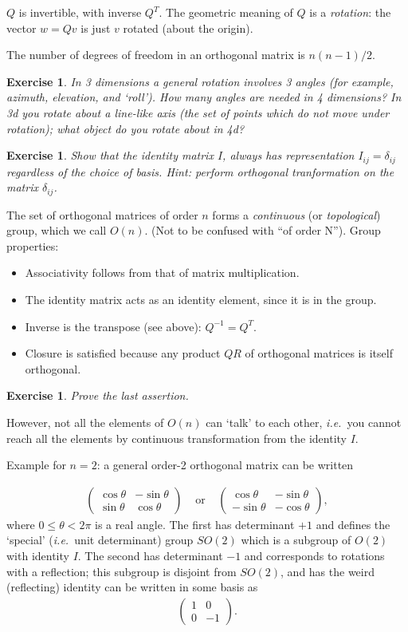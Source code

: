 \documentclass[12pt,letterpaper]{report}
\newcommand\bea{\begin{eqnarray}}
\newcommand\eea{\end{eqnarray}}
\newcommand\bi{\begin{itemize}}
\newcommand\ei{\end{itemize}}
\newcommand\ie{{\it i.e.\ }}
\newtheorem{exe}[thm]{Exercise}
\begin{document}
$Q$ is invertible, with inverse $Q^T$. The geometric meaning of
$Q$ is a {\em rotation}: the vector $w = Q v$ is just $v$ rotated
(about the origin).


The number of degrees of freedom in an orthogonal matrix is
$n(n-1)/2$.

\begin{exe}
In 3 dimensions a general rotation involves 3 angles (for example,
azimuth, elevation, and `roll'). How many angles are needed in 4
dimensions? In 3d you rotate about a line-like axis (the set of
points which do not move under rotation); what object do you
rotate about in 4d?
\end{exe}

\begin{exe}
Show that the identity matrix $I$, always has representation
$I_{ij} = \delta_{ij}$ regardless of the choice of basis. Hint:
perform orthogonal tranformation on the matrix $\delta_{ij}$.
\end{exe}


The set of orthogonal matrices of order $n$ forms a {\em
continuous} (or {\em topological}) group, which we call $O(n)$.
(Not to be confused with ``of order N''). Group properties: \bi
\item Associativity follows from that of matrix multiplication.
\item The identity matrix acts as an identity element, since it
is in the group.
\item Inverse is the transpose (see above): $Q^{-1} = Q^T$.
\item Closure is satisfied because any product $QR$ of orthogonal
matrices is itself orthogonal. \ei

\begin{exe}
Prove the last assertion.
\end{exe}

However, not all the elements of $O(n)$ can `talk' to each other,
\ie you cannot reach all the elements by continuous transformation
from the identity $I$.

Example for $n=2$: a general order-2 orthogonal matrix can be
written

\bea
\left(\begin{array}{ll}\cos \theta & -\sin\theta\\
\sin \theta & \cos\theta\end{array}\right)
\;\;\;\;\mbox{or}\;\;\;\;
\left(\begin{array}{ll}\cos \theta & -\sin\theta\\
-\sin \theta & -\cos\theta\end{array}\right) , \eea where $0 \le
\theta < 2\pi$ is a real angle. The first has determinant $+1$ and
defines the `special' (\ie unit determinant) group $SO(2)$ which
is a subgroup of $O(2)$ with identity $I$. The second has
determinant $-1$ and corresponds to rotations with a reflection;
this subgroup is disjoint from $SO(2)$, and has the weird
(reflecting) identity can be written in some basis as \bea
\left(\begin{array}{ll}1 & 0\\
0 & -1 \end{array}\right) . \eea
\end{document}

